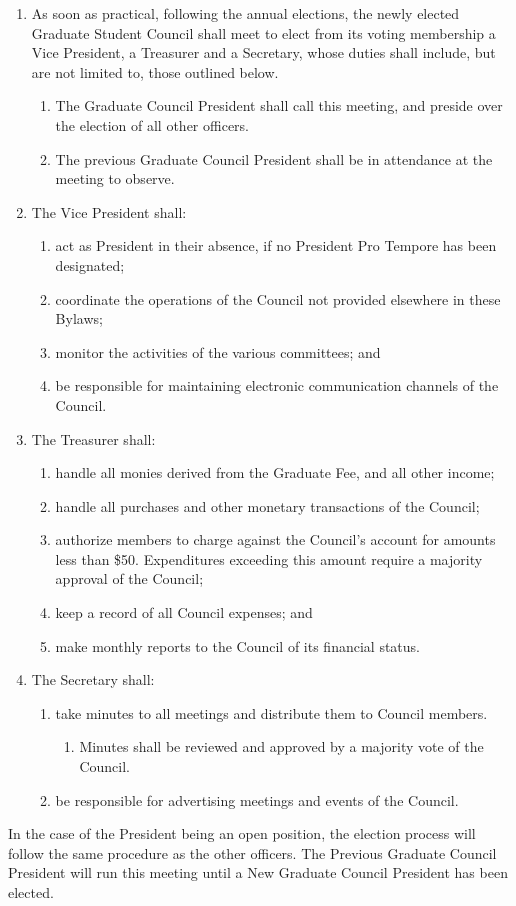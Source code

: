 \begin{enumerate}
\item As soon as practical, following the annual elections, the newly elected Graduate Student Council shall meet to elect from its voting membership a Vice President, a Treasurer and a Secretary, whose duties shall include, but are not limited to, those outlined below.
  \begin{enumerate}
  \item The Graduate Council President shall call this meeting, and preside over the election of all other officers.
  \item The previous Graduate Council President shall be in attendance at the meeting to observe.
  \end{enumerate}
\item The Vice President shall:
  \begin{enumerate}
  \item act as President in their absence, if no President Pro Tempore has been designated;
  \item coordinate the operations of the Council not provided elsewhere in these Bylaws;
  \item monitor the activities of the various committees; and
  \item be responsible for maintaining electronic communication channels of the Council.
  \end{enumerate}
\item The Treasurer shall:
  \begin{enumerate}
  \item handle all monies derived from the Graduate Fee, and all other income;
  \item handle all purchases and other monetary transactions of the Council;
  \item authorize members to charge against the Council's account for amounts less than \$50. Expenditures exceeding this amount require a majority approval of the Council;
  \item keep a record of all Council expenses; and
  \item make monthly reports to the Council of its financial status.
  \end{enumerate}
\item The Secretary shall:
  \begin{enumerate}
  \item take minutes to all meetings and distribute them to Council members.
    \begin{enumerate}
    \item Minutes shall be reviewed and approved by a majority vote of the Council.
    \end{enumerate}
  \item be responsible for advertising meetings and events of the Council.
  \end{enumerate}
\end{enumerate}
In the case of the President being an open position, the election process will follow the same procedure as the other officers. The Previous Graduate Council President will run this meeting until a New Graduate Council President has been elected.

